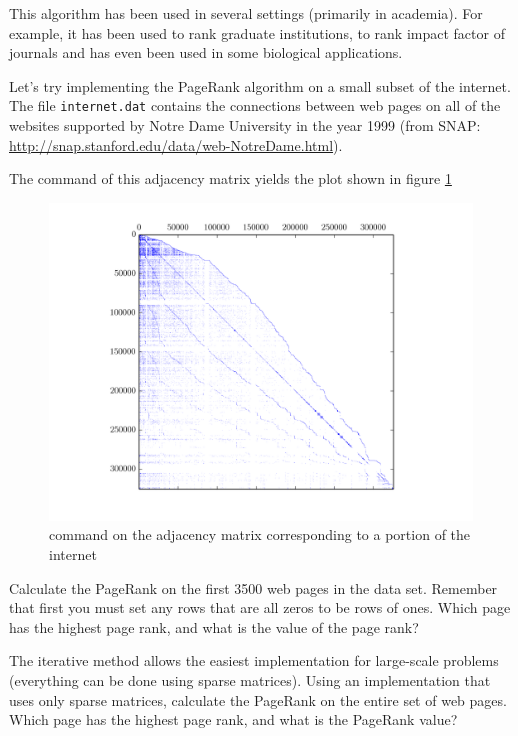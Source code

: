 This algorithm has been used in several settings (primarily in academia).
For example, it has been used to rank graduate institutions, to rank impact factor of journals and has even been used in some biological applications.

Let's try implementing the PageRank algorithm on a small subset of the internet. The file \texttt{internet.dat} contains the connections between web pages on all of the websites supported by Notre Dame University in the year 1999 (from SNAP: \url{http://snap.stanford.edu/data/web-NotreDame.html}).

The  command of this adjacency matrix yields the plot shown in figure \ref{fig:WebSparse}

\begin{figure}
\centering
\includegraphics[width=\textwidth]{sparse_web.png}
\caption{ command on the adjacency matrix corresponding to a portion of the internet}
\label{fig:WebSparse}
\end{figure}

\begin{problem}
Calculate the PageRank on the first 3500 web pages in the data set. Remember that first you must set any rows that are all zeros to be rows of ones. Which page has the highest page rank, and what is the value of the page rank?
\label{prob:pg_calc}
\end{problem}

\begin{problem}
The iterative method allows the easiest implementation for large-scale problems (everything can be done using sparse matrices).
Using an implementation that uses only sparse matrices, calculate the PageRank on the entire set of web pages.
Which page has the highest page rank, and what is the PageRank value?
\end{problem}

